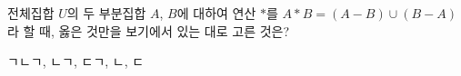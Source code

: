 전체집합 $U$의 두 부분집합 $A$, $B$에 대하여 연산 $\ast$를 $A\ast B=(A-B)\cup(B-A)$라 할 때, 옳은 것만을 보기에서 있는 대로 고른 것은? 
\begin{choices32}{ㄱ}{ㄴ}{ㄱ, ㄴ}{ㄱ, ㄷ}{ㄱ, ㄴ, ㄷ}\end{choices32}
